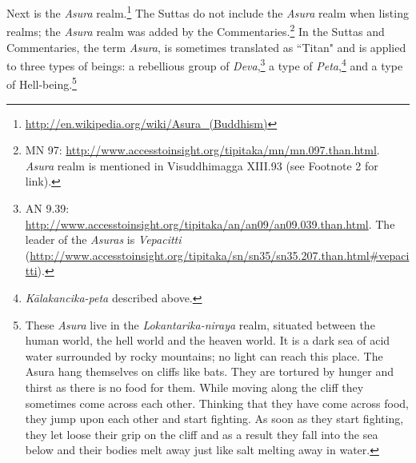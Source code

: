 Next is the \textit{Asura} realm.\footnote{\url{http://en.wikipedia.org/wiki/Asura_(Buddhism)}} The Suttas do not include the \textit{Asura} realm when listing realms; the \textit{Asura} realm was added by the Commentaries.\footnote{MN 97: \url{http://www.accesstoinsight.org/tipitaka/mn/mn.097.than.html}. \textit{Asura} realm is mentioned in Visuddhimagga XIII.93 (see Footnote 2 for link).} In the Suttas and Commentaries, the term \textit{Asura}, is sometimes translated as ``Titan" and is applied to three types of beings: a rebellious group of \textit{Deva},\footnote{AN 9.39: \url{http://www.accesstoinsight.org/tipitaka/an/an09/an09.039.than.html}. The leader of the \textit{Asuras} is \textit{Vepacitti} (\url{http://www.accesstoinsight.org/tipitaka/sn/sn35/sn35.207.than.html\#vepacitti}).} a type of \textit{Peta},\footnote{\textit{Kālakancika-peta} described above.} and a type of Hell-being.\footnote{These \textit{Asura} live in the \textit{Lokantarika-niraya} realm, situated between the human world, the hell world and the heaven world. It is a dark sea of acid water surrounded by rocky mountains; no light can reach this place. The Asura hang themselves on cliffs like bats. They are tortured by hunger and thirst as there is no food for them. While moving along the cliff they sometimes come across each other. Thinking that they have come across food, they jump upon each other and start fighting. As soon as they start fighting, they let loose their grip on the cliff and as a result they fall into the sea below and their bodies melt away just like salt melting away in water.}

\pagebreak

\pagebreak

